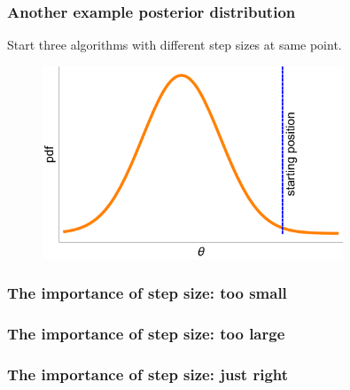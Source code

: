 \documentclass[handout]{beamer}
\begin{document}
\begin{frame}
\frametitle{Another example posterior distribution}
Start three algorithms with different step sizes at same point.

\begin{figure}[ht]
\centerline{\includegraphics[width=0.8\textwidth]{./Figures/lec4_stepSizeStart2.pdf}}
\end{figure}

\end{frame}

\begin{frame}
\frametitle{The importance of step size: too small}

\begin{figure}[t]
\centerline{}
\end{figure}

\end{frame}

\begin{frame}
\frametitle{The importance of step size: too large}

\begin{figure}[t]
\centerline{}
\end{figure}

\end{frame}

\begin{frame}
\frametitle{The importance of step size: just right}

\begin{figure}[t]
\centerline{}
\end{figure}

\end{frame}
\end{document}
